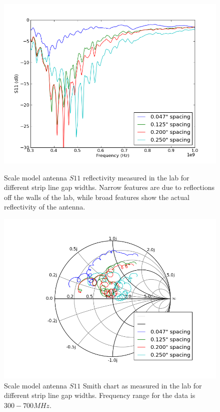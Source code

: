 \begin{figure}[htb]
\centering
\begin{minipage}[b]{0.50\textwidth}
\centering
\includegraphics[width=0.95\linewidth]{SCIHI_system/figures/HIbiscus_S11_model_spacing_dB.png}
\caption{Scale model antenna $S11$ reflectivity measured in the lab for different strip line gap widths. Narrow features are due to reflections off the walls of the lab, while broad features show the actual reflectivity of the antenna. }
\label{Fig:HIS11_model_inc_dB}
\end{minipage}%
\begin{minipage}[b]{0.02\textwidth}
\hspace{1cm}
\end{minipage}%
\begin{minipage}[b]{0.46\textwidth}
\centering
\includegraphics[width=0.95\linewidth]{SCIHI_system/figures/HIbiscus_S11_model_spacing_Smith.png}
\caption{Scale model antenna $S11$ Smith chart as measured in the lab for different strip line gap widths. Frequency range for the data is $300-700 MHz$. }
\label{Fig:HIS11_model_inc_Smith}
\end{minipage}
\end{figure}

